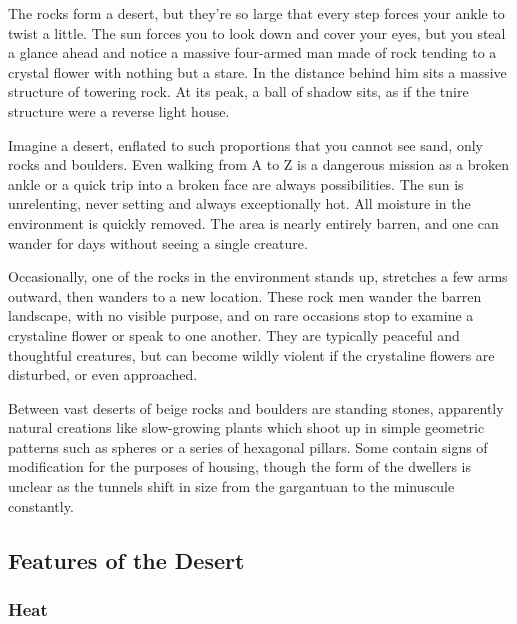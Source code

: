 \begin{multicols}{2}

\begin{boxtext}

	The rocks form a desert, but they're so large that every step forces your ankle to twist a little.
	The sun forces you to look down and cover your eyes, but you steal a glance ahead and notice a massive four-armed man made of rock tending to a crystal flower with nothing but a stare.
	In the distance behind him sits a massive structure of towering rock.
	At its peak, a ball of shadow sits, as if the tnire structure were a reverse light house.

\end{boxtext}

Imagine a desert, enflated to such proportions that you cannot see sand, only rocks and boulders.
Even walking from A to Z is a dangerous mission as a broken ankle or a quick trip into a broken face are always possibilities.  The sun is unrelenting, never setting and always exceptionally hot.  All moisture in the environment is quickly removed.  The area is nearly entirely barren, and one can wander for days without seeing a single creature.

Occasionally, one of the rocks in the environment stands up, stretches a few arms outward, then wanders to a new location.  These rock men wander the barren landscape, with no visible purpose, and on rare occasions stop to examine a crystaline flower or speak to one another.  They are typically peaceful and thoughtful creatures, but can become wildly violent if the crystaline flowers are disturbed, or even approached.

Between vast deserts of beige rocks and boulders are standing stones, apparently natural creations like slow-growing plants which shoot up in simple geometric patterns such as spheres or a series of hexagonal pillars.  Some contain signs of modification for the purposes of housing, though the form of the dwellers is unclear as the tunnels shift in size from the gargantuan to the minuscule constantly.

\subsection{Features of the Desert}

\subsubsection{Heat}


\end{multicols}
